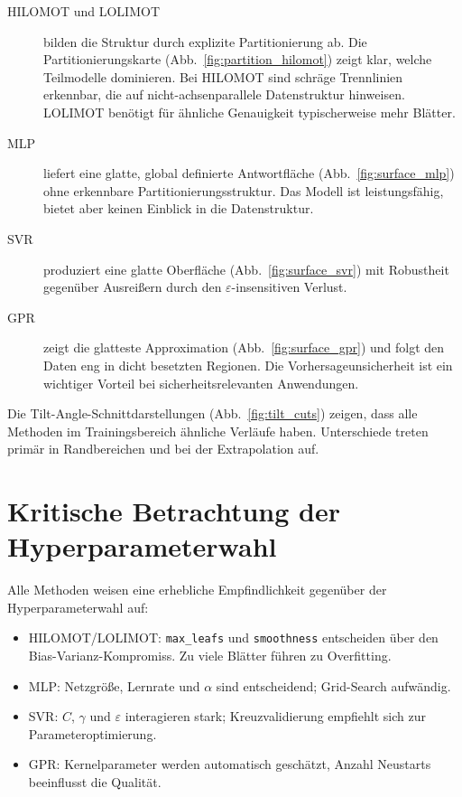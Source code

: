 \documentclass[11pt,a4paper]{report}
\begin{document}
\begin{description}
\item[HILOMOT und LOLIMOT] bilden die Struktur durch explizite Partitionierung ab. Die
    Partitionierungskarte (Abb.~\ref{fig:partition_hilomot}) zeigt klar, welche Teilmodelle
    dominieren. Bei HILOMOT sind schr\"{a}ge Trennlinien erkennbar, die auf nicht-achsenparallele
    Datenstruktur hinweisen. LOLIMOT ben\"{o}tigt f\"{u}r \"{a}hnliche Genauigkeit typischerweise
    mehr Bl\"{a}tter.

\item[MLP] liefert eine glatte, global definierte Antwortfl\"{a}che (Abb.~\ref{fig:surface_mlp})
    ohne erkennbare Partitionierungsstruktur. Das Modell ist leistungsf\"{a}hig, bietet aber
    keinen Einblick in die Datenstruktur.

\item[SVR] produziert eine glatte Oberfl\"{a}che (Abb.~\ref{fig:surface_svr}) mit Robustheit
    gegen\"{u}ber Ausrei\ss{}ern durch den $\varepsilon$-insensitiven Verlust.

\item[GPR] zeigt die glatteste Approximation (Abb.~\ref{fig:surface_gpr}) und folgt den Daten
    eng in dicht besetzten Regionen. Die Vorhersageunsicherheit ist ein wichtiger Vorteil bei
    sicherheitsrelevanten Anwendungen.
\end{description}

Die Tilt-Angle-Schnittdarstellungen (Abb.~\ref{fig:tilt_cuts}) zeigen, dass alle Methoden
im Trainingsbereich \"{a}hnliche Verl\"{a}ufe haben. Unterschiede treten prim\"{a}r in Randbereichen
und bei der Extrapolation auf.

\section{Kritische Betrachtung der Hyperparameterwahl}

Alle Methoden weisen eine erhebliche Empfindlichkeit gegen\"{u}ber der Hyperparameterwahl auf:

\begin{itemize}
\item HILOMOT/LOLIMOT: \texttt{max\_leafs} und \texttt{smoothness} entscheiden \"{u}ber den
      Bias-Varianz-Kompromiss. Zu viele Bl\"{a}tter f\"{u}hren zu Overfitting.
\item MLP: Netzgr\"{o}\ss{}e, Lernrate und $\alpha$ sind entscheidend; Grid-Search aufw\"{a}ndig.
\item SVR: $C$, $\gamma$ und $\varepsilon$ interagieren stark; Kreuzvalidierung empfiehlt sich zur Parameteroptimierung.
\item GPR: Kernelparameter werden automatisch gesch\"{a}tzt, Anzahl Neustarts beeinflusst die
      Qualit\"{a}t.
\end{itemize}
\end{document}
